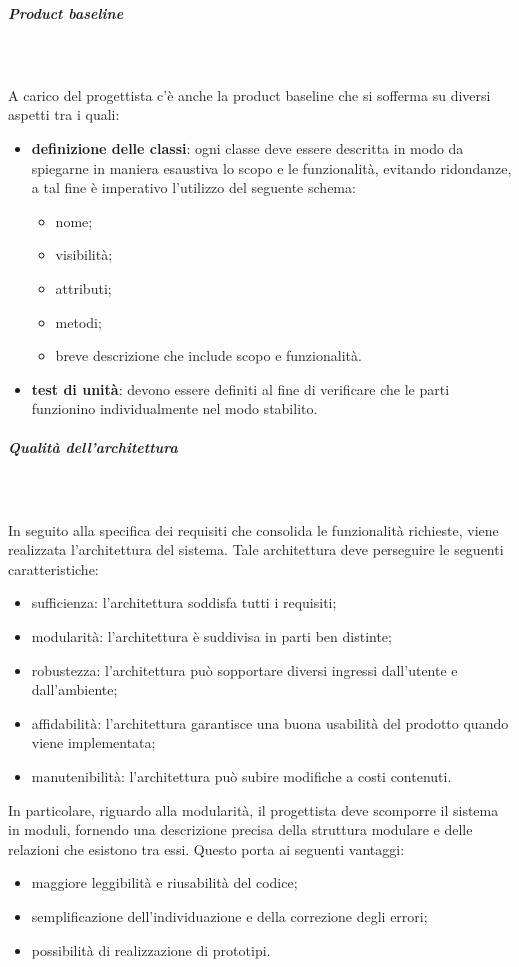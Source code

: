 		\subparagraph{Product baseline} \mbox{}\\ \mbox{}\\
	
			\noindent A carico del progettista c'è anche la product baseline che si sofferma su diversi aspetti tra i quali:
			\begin{itemize}
				\item \textbf{definizione delle classi}: ogni classe deve essere descritta 
					in modo da spiegarne in maniera esaustiva lo scopo e le funzionalità, evitando 
					ridondanze, a tal fine è imperativo l'utilizzo del seguente 
					schema:
					\begin{itemize}
						\item nome;
						\item visibilità;
						\item attributi;
						\item metodi;
						\item breve descrizione che include scopo e 
						funzionalità.
					\end{itemize}
				\item \textbf{test di unità}: devono essere definiti al fine di verificare 
					che le parti funzionino individualmente nel modo stabilito.
			\end{itemize}
			
		\subparagraph{Qualità dell'architettura} \mbox{}\\ \mbox{}\\
		In seguito alla specifica dei requisiti che consolida le funzionalità 
		richieste, viene realizzata l'architettura del sistema. Tale architettura deve 
 		perseguire le seguenti caratteristiche:
 			\begin{itemize}
 				\item sufficienza: l'architettura soddisfa tutti i requisiti; 
 				\item  modularità: l'architettura è suddivisa in parti ben 
					distinte;
				\item robustezza: l'architettura può sopportare diversi ingressi dall'utente e 
					dall'ambiente;
				\item affidabilità: l'architettura garantisce una buona usabilità del prodotto 
					quando viene implementata;
				\item manutenibilità: l'architettura può subire modifiche a costi contenuti.
 			\end{itemize}
 		
 		In particolare, riguardo alla modularità, il progettista deve scomporre il sistema in
 		moduli, fornendo una descrizione precisa della struttura modulare e delle relazioni 
 		che esistono tra essi. Questo porta ai seguenti vantaggi:
 			\begin{itemize}
 				\item maggiore leggibilità e riusabilità del codice;
 				\item semplificazione dell'individuazione e della correzione degli errori;
 				\item possibilità di realizzazione di prototipi.
 			\end{itemize}
 		   
